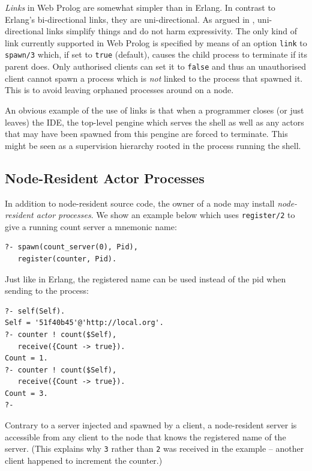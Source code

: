 \documentclass{tlp}
\begin{document}
\textit{Links} in Web Prolog are somewhat simpler than in Erlang. In contrast to Erlang's bi-directional links, they are uni-directional. As argued in \cite{conf/erlang/SvenssonFE10}, uni-directional links simplify things and do not harm expressivity. The only kind of link currently supported in Web Prolog is specified by means of an option \texttt{link} to \texttt{spawn/3} which, if set to \texttt{true} (default), causes the child process to terminate if its parent does. Only authorised clients can set it to \texttt{false} and thus an unauthorised client cannot spawn a process which is \textit{not} linked to the process that spawned it. This is to avoid leaving orphaned processes around on a node.

An obvious example of the use of links is that when a programmer closes (or just leaves) the IDE, the top-level pengine which serves the shell as well as any actors that may have been spawned from this pengine are forced to terminate. This might be seen as a supervision hierarchy rooted in the process running the shell.


\subsection{Node-Resident Actor Processes}

In addition to node-resident source code, the owner of a node may install \textit{node-resident actor processes}. We show an example below which uses \texttt{register/2} to give a running count server a mnemonic name:

\begin{lstlisting}
?- spawn(count_server(0), Pid),
   register(counter, Pid). 
\end{lstlisting}   

\noindent Just like in Erlang, the registered name can be used instead of the pid when sending to the process:

\begin{lstlisting}
?- self(Self).
Self = '51f40b45'@'http://local.org'.
?- counter ! count($Self),
   receive({Count -> true}).
Count = 1.
?- counter ! count($Self),
   receive({Count -> true}).
Count = 3.
?-
\end{lstlisting}   

\noindent Contrary to a server injected and spawned by a client, a node-resident server is accessible from any client to the node that knows the registered name of the server. (This explains why \texttt{3} rather than \texttt{2} was received in the example -- another client happened to increment the counter.)
\end{document}
